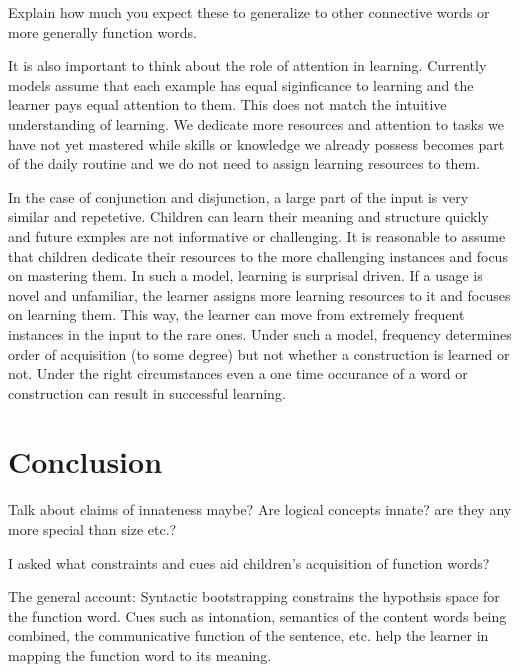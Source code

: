 \documentclass[oneside]{report}
\theoremstyle{definition}
\theoremstyle{definition}
\theoremstyle{definition}
\theoremstyle{remark}
\begin{document}
Explain how much you expect these to generalize to other connective
words or more generally function words.

It is also important to think about the role of attention in learning.
Currently models assume that each example has equal siginficance to
learning and the learner pays equal attention to them. This does not
match the intuitive understanding of learning. We dedicate more
resources and attention to tasks we have not yet mastered while skills
or knowledge we already possess becomes part of the daily routine and we
do not need to assign learning resources to them.

In the case of conjunction and disjunction, a large part of the input is
very similar and repetetive. Children can learn their meaning and
structure quickly and future exmples are not informative or challenging.
It is reasonable to assume that children dedicate their resources to the
more challenging instances and focus on mastering them. In such a model,
learning is surprisal driven. If a usage is novel and unfamiliar, the
learner assigns more learning resources to it and focuses on learning
them. This way, the learner can move from extremely frequent instances
in the input to the rare ones. Under such a model, frequency determines
order of acquisition (to some degree) but not whether a construction is
learned or not. Under the right circumstances even a one time occurance
of a word or construction can result in successful learning.

\chapter{Conclusion}\label{conclusions}

Talk about claims of innateness maybe? Are logical concepts innate? are
they any more special than size etc.?

I asked what constraints and cues aid children's acquisition of function
words?

The general account: Syntactic bootstrapping constrains the hypothsis
space for the function word. Cues such as intonation, semantics of the
content words being combined, the communicative function of the
sentence, etc. help the learner in mapping the function word to its
meaning.
\end{document}
